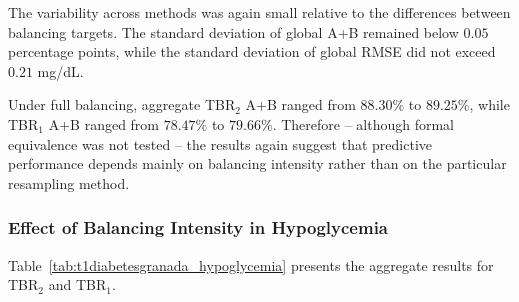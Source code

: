 The variability across methods was again small relative to the differences between balancing targets. The standard deviation of global A+B remained below \(0.05\) percentage points, while the standard deviation of global RMSE did not exceed \(0.21\) mg/dL.

Under full balancing, aggregate TBR$_2$ A+B ranged from \(88.30\%\) to \(89.25\%\), while TBR$_1$ A+B ranged from \(78.47\%\) to \(79.66\%\). Therefore -- although formal equivalence was not tested -- the results again suggest that predictive performance depends mainly on balancing intensity rather than on the particular resampling method.

\subsubsection{Effect of Balancing Intensity in Hypoglycemia}
\label{subsubsec:t1diabetesgranadasemi_balancing}

Table~\ref{tab:t1diabetesgranada_hypoglycemia} presents the aggregate results for TBR$_2$ and TBR$_1$.

\begin{table}[htbp]
    \centering
    \caption{T1DiabetesGranada performance in the hypoglycemic ranges,
    averaged across balancing methods.}
    \label{tab:t1diabetesgranada_hypoglycemia}
\end{table}

